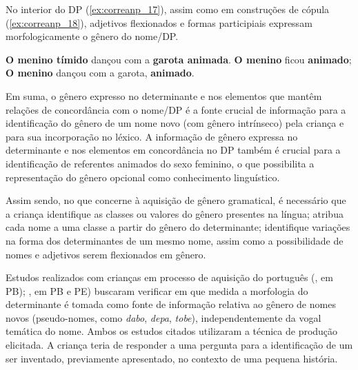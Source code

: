 \documentclass[output=paper]{LSP/langsci}
\begin{document}
No interior do DP (\ref{ex:correanp_17}), assim como em construções de cópula (\ref{ex:correanp_18}), adjetivos flexionados e formas participiais expressam morfologicamente o gênero do nome/DP. 

\ea\label{ex:correanp_17} \textbf{O menino tímido} dançou com a \textbf{garota animada}.
\z
\ea\label{ex:correanp_18} \textbf{O menino} ficou \textbf{animado}; \textbf{O menino} dançou com a garota, \textbf{animado}.
\z

Em suma, o gênero expresso no determinante e nos elementos que mantêm relações de concordância com o nome/DP é a fonte crucial de informação para a identificação do gênero de um nome novo (com gênero intrínseco) pela criança e para sua incorporação no léxico. A informação de gênero expressa no determinante e nos elementos em concordância no DP também é crucial para a identificação de referentes animados do sexo feminino, o que possibilita a representação do gênero opcional como conhecimento linguístico. 

Assim sendo, no que concerne à aquisição de gênero gramatical, é necessário que a criança identifique as classes ou valores do gênero presentes na língua; atribua cada nome a uma classe a partir do gênero do determinante; identifique variações na forma dos determinantes de um mesmo nome, assim como a possibilidade de nomes e adjetivos serem flexionados em gênero. 

Estudos realizados com crianças em processo de aquisição do português (\citealt{correaname2003}, em PB); \citealt{correa_etal2010}, em PB e PE) buscaram verificar em que medida a morfologia do determinante é tomada como fonte de informação relativa ao gênero de nomes novos (pseudo-nomes, como \textit{dabo}, \textit{depa}, \textit{tobe}), independentemente da vogal temática do nome. Ambos os estudos citados utilizaram a técnica de produção elicitada. A criança teria de responder a uma pergunta para a identificação de um ser inventado, previamente apresentado, no contexto de uma pequena história. 
\end{document}
